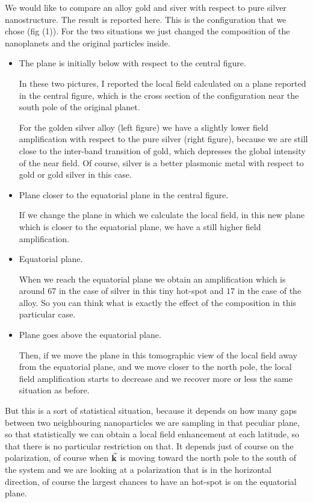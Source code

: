 \documentclass[../main/main.tex]{subfiles}
\begin{document}
We would like to compare an alloy gold and siver with respect to pure silver nanostructure.  The result is reported here.
This is the configuration that we chose (fig (1)). For the two situations we just changed the composition of the nanoplanets and the original particles inside.


\begin{itemize}
\item The plane is initially below with respect to the central figure.

In these two pictures, I reported the local field calculated on a plane reported in the central figure, which is the cross section of the configuration near the south pole of the original planet.

For the golden silver alloy (left figure) we have a slightly lower field amplification with respect to the pure silver (right figure), because we are still close to the inter-band transition of gold, which depresses the global intensity of the near field.
Of course, silver is a better plasmonic metal with respect to gold or gold silver in this case.


\item Plane closer to the equatorial plane in the central figure.

If we change the plane in which we calculate the local field, in this new plane which is closer to the equatorial plane, we have a still higher field amplification.


\item Equatorial plane.

When we reach the equatorial plane we obtain an amplification which is around $67$ in the case of silver in this tiny hot-spot and $17$ in the case of the alloy. So you can think what is exactly the effect of the composition in this particular case.

\item Plane goes above the equatorial plane.

Then, if we move the plane in this tomographic view of the local field away from the equatorial plane, and we move closer to the north pole, the local field amplification starts to decrease and we recover more or less the same situation as before.

\end{itemize}


But this is a sort of statistical situation, because it depends on how many gaps between two neighbouring nanoparticles we are sampling in that peculiar plane, so that statistically we can obtain a local field enhancement at each latitude, so that there is no particular restriction on that.
It depends just of course on the polarization, of course when \( \va{k} \) is moving toward the north pole to the south of the system and we are looking at a polarization that is in the horizontal direction, of course the largest chances to have an hot-spot is on the equatorial plane.



\clearpage
\end{document}
